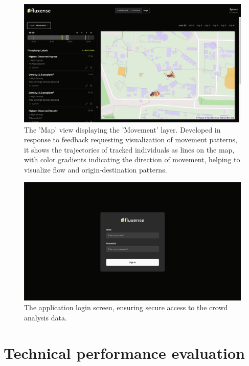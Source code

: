 \begin{figure}[H]
  \centering
  \includegraphics[width=\textwidth]{Pictures/Misc/Frontend/map_movement.png}
  \caption{The 'Map' view displaying the 'Movement' layer. Developed in response to feedback requesting visualization of movement patterns, it shows the trajectories of tracked individuals as lines on the map, with color gradients indicating the direction of movement, helping to visualize flow and origin-destination patterns.}
  \label{fig:showcase:map-movement}

\end{figure}


\begin{figure}[H]
  \centering
  \includegraphics[width=\textwidth]{Pictures/Misc/Frontend/login.png}
  \caption{The application login screen, ensuring secure access to the crowd analysis data.}
  \label{fig:showcase:login}

\end{figure}



\section{Technical performance evaluation}


